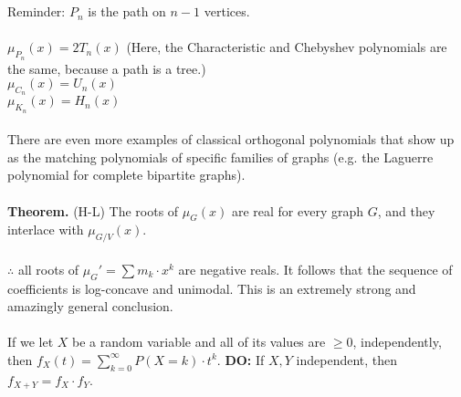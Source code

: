 \documentclass[12pt]{article}
\theoremstyle{remark}
\begin{document}
\begin{section}
\\\\
Reminder: $P_n$ is the path on $n-1$ vertices.
\\\\
$\mu_{P_n}(x) = 2T_n(x)$ (Here, the Characteristic and Chebyshev polynomials are the same, because a path is a tree.) 
\\
$\mu_{C_n}(x) = U_n(x)$
\\
$\mu_{K_n}(x) = H_n(x)$
\\\\
There are even more examples of classical orthogonal polynomials that show up as the matching polynomials of specific families of graphs (e.g. the Laguerre polynomial for complete bipartite graphs). 
\\\\
\textbf{Theorem.} (H-L) The roots of $\mu_G(x)$ are real for every graph $G$, and they interlace with $\mu_{G/V}(x)$.
\\\\
$\therefore$ all roots of $\mu_G' = \sum m_k \cdot x^k$ are negative reals. It follows that the sequence of coefficients is log-concave and unimodal. This is an extremely strong and amazingly general conclusion.
\\\\
If we let $X$ be a random variable and all of its values are $\geq 0$, independently, then $f_X(t) = \sum_{k=0}^\infty P(X=k)\cdot t^k$. \textbf{DO:} If $X,Y$ independent, then $f_{X+Y} = f_X \cdot f_Y$.

\end{section}

\newpage
\end{document}
